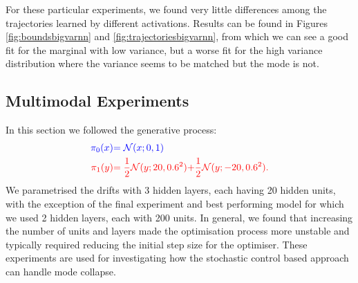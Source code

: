 \documentclass[a4paper,12pt,twoside,openright]{report}
\theoremstyle{definition}
\begin{document}
For these particular experiments, we found very little differences among the trajectories learned by different activations. Results can be found in Figures \ref{fig:boundsbigvarnn} and \ref{fig:trajectoriesbigvarnn}, from which we can see a good fit for the marginal with low variance, but a worse fit for the high variance distribution where the variance seems to be matched but the mode is not.
\subsection{Multimodal Experiments}
In this section we followed the generative process:
\begin{align*}
     \color{blue}{\pi_0(x)} &\color{blue}{= {\mathcal{N}}(x; 0,  1)} \\
    \color{red}{\pi_1(y)} &\color{red}{= \frac{1}{2}{\mathcal{N}}(y; 20, 0.6 ^2)}\color{red}{ + \frac{1}{2}{\mathcal{N}}(y; -20, 0.6 ^2) }.
\end{align*}
We parametrised the drifts with 3 hidden layers, each having 20 hidden units, with the exception of the final experiment and best performing model for which we used 2 hidden layers, each with 200 units. In general, we found that increasing the number of units and layers made the optimisation process more unstable and typically required reducing the initial step size for the optimiser. These experiments are used for investigating how the stochastic control based approach can handle mode collapse.
\end{document}
